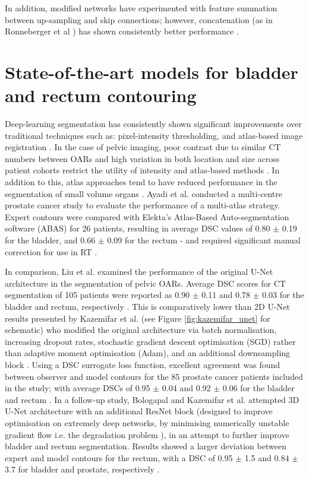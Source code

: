 In addition, modified networks have experimented with feature summation between
up-sampling and skip connections; however, concatenation (as in Ronneberger et
al \cite{Ronneberger_2015}) has shown consistently better performance
\cite{Zhu_2018}.


\section{State-of-the-art models for bladder and rectum contouring}
Deep-learning segmentation has consistently shown significant improvements over
traditional techniques such as: pixel-intensity thresholding, and atlas-based
image registration \cite{Cardenas2019}. In the case of pelvic imaging, poor
contrast due to similar CT numbers between OARs and high variation in both
location and size across patient cohorts restrict the utility of intensity and
atlas-based methods \cite{acosta2013}. In addition to this, atlas approaches
tend to have reduced performance in the segmentation of small volume organs
\cite{acosta2013}. Ayadi et al. conducted a multi-centre prostate cancer study
to evaluate the performance of a multi-atlas strategy. Expert contours were
compared with Elekta's Atlas-Based Auto-segmentation software (ABAS) for 26 patients,
resulting in average DSC values of 0.80 $\pm$ 0.19 for the bladder, and 0.66
$\pm$ 0.09 for the rectum - and required significant manual correction for use in
RT \cite{Ayadi2011}.

In comparison, Liu et al. examined the performance of the original U-Net
architecture in the segmentation of pelvic OARs. Average DSC scores for CT
segmentation of 105 patients were reported as 0.90 $\pm$ 0.11 and 0.78 $\pm$
0.03 for the bladder and rectum, respectively \cite{Liu_2020}. This is
comparatively lower than 2D U-Net results presented by Kazemifar et al. (see
Figure \ref{fig:kazemifar_unet} for schematic) who modified the original
architecture via batch normalisation, increasing dropout rates, stochastic
gradient descent optimisation (SGD) rather than adaptive moment optimisation
(Adam), and an additional downsampling block \cite{Kazemifar_2018}. Using a DSC
surrogate loss function, excellent agreement was found between observer and
model contours for the 85 prostate cancer patients included in the study; with
average DSCs of 0.95 $\pm$ 0.04 and 0.92 $\pm$ 0.06 for the bladder and rectum
\cite{Kazemifar_2018}. In a follow-up study, Bologapal and Kazemifar et al.
attempted 3D U-Net architecture with an additional ResNet block (designed to
improve optimisation on extremely deep networks, by minimising numerically
unstable gradient flow \cite{Maier2019} i.e. the degradation problem
\cite{He2015deep}), in an attempt to further improve bladder and rectum
segmentation. Results showed a larger deviation between expert and model
contours for the rectum, with a DSC of 0.95 $\pm$ 1.5 and 0.84 $\pm$ 3.7 for
bladder and prostate, respectively \cite{Balagopal_2018}.

